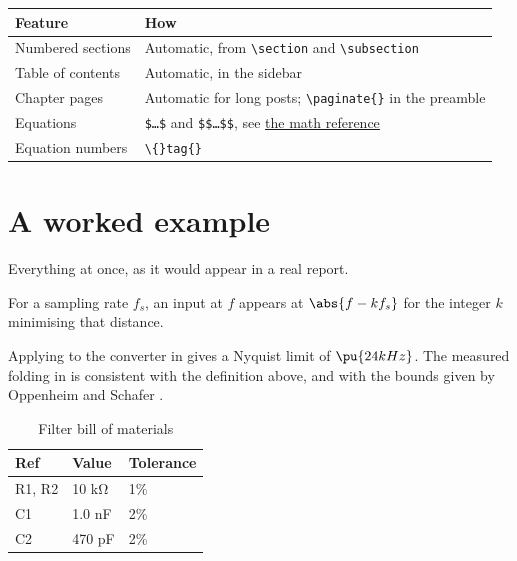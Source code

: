\begin{tabular}{ll}
\hline
Feature & How \\
\hline
Numbered sections & Automatic, from \texttt{\textbackslash{}section} and \texttt{\textbackslash{}subsection} \\
Table of contents & Automatic, in the sidebar \\
Chapter pages & Automatic for long posts; \texttt{\textbackslash{}paginate\{\}} in the preamble \\
Equations & \texttt{\$…\$} and \texttt{\$\$…\$\$}, see \href{/blog/katex-math-reference}{the math reference} \\
Equation numbers & \texttt{\textbackslash\{\}tag\{\}} \\
\hline
\end{tabular}

\section{A worked example}

Everything at once, as it would appear in a real report.

\begin{abstract}
A 4th-order Butterworth anti-aliasing filter at $\pu{20 kHz}$ keeps all folded energy below −70 dBFS for the converter measured here.
\end{abstract}

\begin{definition}
For a sampling rate $f_s$, an input at $f$ appears at $\abs{f - k f_s}$ for the integer $k$ minimising that distance.
\end{definition}

Applying  to the converter in  gives a Nyquist limit of $\pu{24 kHz}$. The measured folding in  is consistent with the definition above, and with the bounds given by Oppenheim and Schafer \cite{oppenheim1999}.

\begin{table}
\caption{Filter bill of materials}
\label{tbl-bom}
\begin{tabular}{lll}
\hline
Ref & Value & Tolerance \\
\hline
R1, R2 & 10 kΩ & 1\% \\
C1 & 1.0 nF & 2\% \\
C2 & 470 pF & 2\% \\
\hline
\end{tabular}
\end{table}

